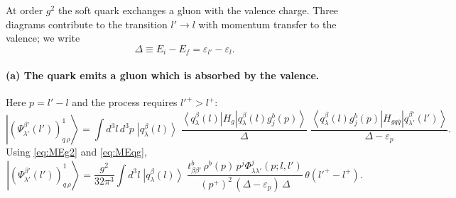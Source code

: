 \documentclass[11pt,a4paper]{article}
\numberwithin{equation}{section}
\newcommand{\eps}{\varepsilon}
\newcommand{\ket}[1]{\left|#1\right\rangle}
\newcommand{\bra}[1]{\left\langle#1\right|}
\newcommand{\Ph}{\Phi}
\newcommand{\qk}[3]{q^{#1}_{#2}(#3)}
\newcommand{\gl}[3]{g^{#1}_{#2}(#3)}
\begin{document}
At order $g^{2}$ the soft quark exchanges a gluon with the valence charge. Three diagrams
contribute to the transition $l'\to l$ with momentum transfer to the valence; we write
\begin{equation}
\Delta\equiv E_{i}-E_{f}=\eps_{l'}-\eps_{l}.
\end{equation}

\paragraph{(a) The quark emits a gluon which is absorbed by the valence.}
\begin{center}
\end{center}
Here $p=l'-l$ and the process requires $l'^{+}>l^{+}$:
\begin{equation}
\ket{(\Psi^{\beta'}_{\lambda'}(l'))^{1}_{q\,\rho}}=\int\!d^{3}l\,d^{3}p\;\ket{\qk{\beta}{\lambda}{l}}\;
\frac{\bra{\qk{\beta}{\lambda}{l}}H_{g}\ket{\qk{\beta}{\lambda}{l}\gl{b}{j}{p}}}{\Delta}\;
\frac{\bra{\qk{\beta}{\lambda}{l}\gl{b}{j}{p}}H_{gq\bar q}\ket{\qk{\beta'}{\lambda'}{l'}}}{\Delta-\eps_{p}} .
\end{equation}
Using \eqref{eq:MEg2} and \eqref{eq:MEqg},
\begin{equation}
\ket{(\Psi^{\beta'}_{\lambda'}(l'))^{1}_{q\,\rho}}=\frac{g^{2}}{32\pi^{3}}\int\!d^{3}l\;\ket{\qk{\beta}{\lambda}{l}}\;
\frac{t^{b}_{\beta\beta'}\,\rho^{b}(p)\,p^{j}\Ph^{j}_{\lambda\lambda'}(p;l,l')}{(p^{+})^{2}\,(\Delta-\eps_{p})\,\Delta}\,
\theta(l'^{+}-l^{+}) .
\label{eq:P1a}
\end{equation}
\end{document}
